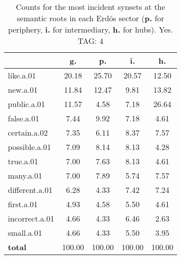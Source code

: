 \begin{table}[h!]
\begin{center}
\begin{tabular}{| l | c | c | c | c |}\hline
 & g. & p. & i. & h. \\\hline
like.a.01 & 20.18  & 25.70  & 20.57  & 12.50 \\\hline
new.a.01 & 11.84  & 12.47  & 9.81  & 13.82 \\\hline
public.a.01 & 11.57  & 4.58  & 7.18  & 26.64 \\\hline
false.a.01 & 7.44  & 9.92  & 7.18  & 4.61 \\\hline
certain.a.02 & 7.35  & 6.11  & 8.37  & 7.57 \\\hline
possible.a.01 & 7.09  & 8.14  & 8.13  & 4.28 \\\hline
true.a.01 & 7.00  & 7.63  & 8.13  & 4.61 \\\hline
many.a.01 & 7.00  & 7.89  & 5.74  & 7.57 \\\hline
different.a.01 & 6.28  & 4.33  & 7.42  & 7.24 \\\hline
first.a.01 & 4.93  & 4.58  & 5.50  & 4.61 \\\hline
incorrect.a.01 & 4.66  & 4.33  & 6.46  & 2.63 \\\hline
small.a.01 & 4.66  & 4.33  & 5.50  & 3.95 \\\hline
{{\bf total}} & 100.00  & 100.00  & 100.00  & 100.00 \\\hline
\end{tabular}
\caption{Counts for the most incident synsets at the semantic roots in each Erd\"os sector ({\bf p.} for periphery, {\bf i.} for intermediary, {\bf h.} for hubs). Yes. TAG: 4}
\end{center}
\end{table}